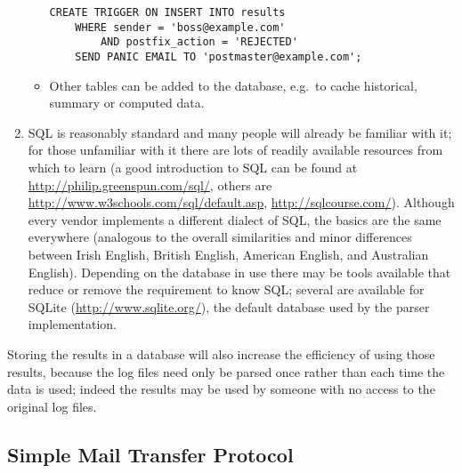 \begin{enumerate}
\begin{itemize}
\begin{verbatim}
CREATE TRIGGER ON INSERT INTO results
    WHERE sender = 'boss@example.com'
        AND postfix_action = 'REJECTED'
    SEND PANIC EMAIL TO 'postmaster@example.com';
\end{verbatim}

            \item Other tables can be added to the database, e.g.\ to cache
                historical, summary or computed data.

        \end{itemize}


    \item \gls{SQL} is reasonably standard and many people will already be
        familiar with it; for those unfamiliar with it there are lots of
        readily available resources from which to learn (a good
        introduction to \gls{SQL} can be found at
        \url{http://philip.greenspun.com/sql/}, others are
        \url{http://www.w3schools.com/sql/default.asp},
        \url{http://sqlcourse.com/}).  Although every vendor implements a
        different dialect of \gls{SQL}, the basics are the same everywhere
        (analogous to the overall similarities and minor differences
        between Irish English, British English, American English, and
        Australian English).  Depending on the database in use there may be
        tools available that reduce or remove the requirement to know
        \gls{SQL}; several are available for \gls{SQLite}
        (\url{http://www.sqlite.org/}), the default database used by the
        parser implementation.

\end{enumerate}

Storing the results in a database will also increase the efficiency of
using those results, because the log files need only be parsed once rather
than each time the data is used; indeed the results may be used by someone
with no access to the original log files.



\subsection{Simple Mail Transfer Protocol}

\label{SMTP background}

